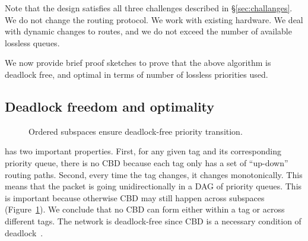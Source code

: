 Note that the design satisfies all three challenges described in
\S\ref{sec:challanges}. We do not change the routing protocol. We work with
existing hardware. We deal with dynamic changes to routes, and we do not exceed
the number of available lossless queues.

We now provide brief proof sketches to prove that the above algorithm is
deadlock free, and optimal in terms of number of lossless priorities used. 

\subsection {Deadlock freedom and optimality}

\begin{figure}[t]
	\centering
	
	
	\caption{Ordered subspaces ensure deadlock-free priority transition.}\label{fig:subspace}
\end{figure}

 \system{} has two important
properties. First, for any given tag and its corresponding priority queue, there
is no CBD because each tag only has a set of ``up-down'' routing paths.  Second,
every time the tag changes, it changes monotonically. This means that the packet
is going unidirectionally in a DAG of priority queues. This is important because
otherwise CBD may still happen across subspaces (Figure~\ref{fig:subspace}).  We
conclude that no CBD can form either within a tag or across different tags. The
network is deadlock-free since CBD is a necessary condition of
deadlock~\cite{our_hotnets_paper}.

